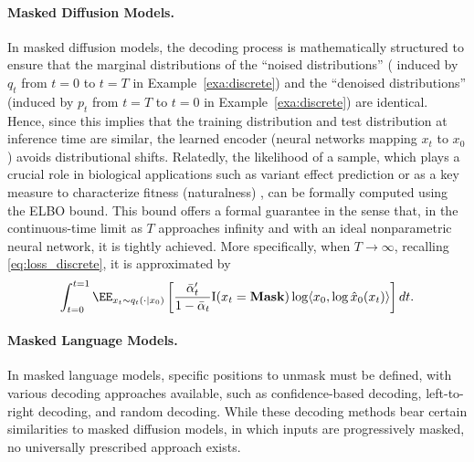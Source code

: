 {{\paragraph{Masked Diffusion Models.} In masked diffusion models, the decoding process is mathematically structured to ensure that the marginal distributions of the ``noised distributions'' ( induced by $q_t$ from $t=0$ to $t=T$ in Example~\ref{exa:discrete})  and the ``denoised distributions'' (induced by $p_t$ from $t=T$ to $t=0$ in Example~\ref{exa:discrete}) are identical. Hence, since this implies that the training distribution and test distribution at inference time are similar, the learned encoder (neural networks mapping $x_t$ to $x_0$) avoids distributional shifts. Relatedly, the likelihood of a sample, which plays a crucial role in biological applications such as variant effect prediction \citep{livesey2023advancing} or as a key measure to characterize fitness (naturalness) \citep{hie2024efficient}, can be formally computed using the ELBO bound. This bound offers a formal guarantee in the sense that, in the continuous-time limit as $T$ approaches infinity and with an ideal nonparametric neural network, it is tightly achieved. More specifically, when $T\to \infty$, recalling \eqref{eq:loss_discrete}, it is approximated by 
\begin{align*}
    \int_{t=0}^{t=1} \EE_{x_t \sim q_t(\cdot\mid x_0)}\left [ \frac{\bar \alpha'_t}{1-\bar \alpha_t}\rI(x_t = \textbf{Mask})\log \langle x_0,\log \hat x_0(x_t)\rangle \right ]dt. 
\end{align*}


\paragraph{Masked Language Models.} In masked language models, specific positions to unmask must be defined, with various decoding approaches available, such as confidence-based decoding, left-to-right decoding, and random decoding. While these decoding methods bear certain similarities to masked diffusion models, in which inputs are progressively masked, no universally prescribed approach exists.

}}
